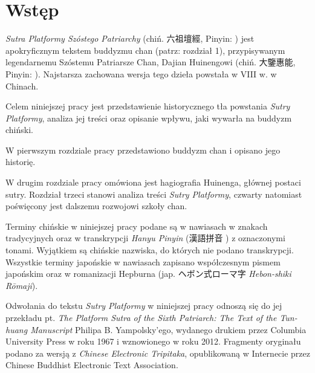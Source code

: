 \chapter*{Wstęp}
\renewcommand{\headrulewidth}{0.3pt}

\textit{Sutra Platformy Szóstego Patriarchy} (chiń. 六祖壇經, Pinyin: ) jest apokryficznym tekstem buddyzmu chan (patrz: rozdział 1), przypisywanym legendarnemu Szóstemu Patriarsze Chan, Dajian Huinengowi (chiń. 大鑒惠能, Pinyin: ). Najstarsza zachowana wersja tego dzieła powstała w VIII w. w Chinach.

Celem niniejszej pracy jest przedstawienie historycznego tła powstania \textit{Sutry Platformy}, analiza jej treści oraz opisanie wpływu, jaki wywarła na buddyzm chiński.

W pierwszym rozdziale pracy przedstawiono buddyzm chan i opisano jego historię.

W drugim rozdziale pracy omówiona jest hagiografia Huinenga, głównej postaci sutry.
Rozdział trzeci stanowi analiza treści \textit{Sutry Platformy}, czwarty natomiast poświęcony jest dalszemu rozwojowi szkoły chan.

Terminy chińskie w niniejszej pracy podane są w nawiasach w znakach tradycyjnych oraz w transkrypcji \textit{Hanyu Pinyin} (漢語拼音 ) z oznaczonymi tonami. Wyjątkiem są chińskie nazwiska, do których nie podano transkrypcji.
Wszystkie terminy japońskie w nawiasach zapisano współczesnym pismem japońskim oraz w romanizacji Hepburna (jap. {\ipaexgothic ヘボン式ローマ字} \textit{Hebon-shiki Rōmaji}).

Odwołania do tekstu \textit{Sutry Platformy} w niniejszej pracy odnoszą się do jej przekładu pt. \textit{The Platform Sutra of the Sixth Patriarch: The Text of the Tun-huang Manuscript} Philipa B. Yampolsky'ego, wydanego drukiem przez Columbia University Press w roku 1967 i wznowionego w roku 2012.
Fragmenty oryginału podano za wersją z \textit{Chinese Electronic Tripitaka}, opublikowaną w Internecie przez Chinese Buddhist Electronic Text Association.
